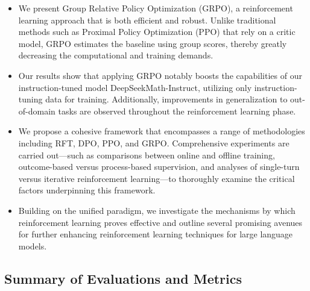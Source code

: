\begin{itemize}[topsep=0pt]
    \item We present Group Relative Policy Optimization (GRPO), a reinforcement learning approach that is both efficient and robust. Unlike traditional methods such as Proximal Policy Optimization (PPO) that rely on a critic model, GRPO estimates the baseline using group scores, thereby greatly decreasing the computational and training demands.
    \item Our results show that applying GRPO notably boosts the capabilities of our instruction-tuned model DeepSeekMath-Instruct, utilizing only instruction-tuning data for training. Additionally, improvements in generalization to out-of-domain tasks are observed throughout the reinforcement learning phase.
    \item We propose a cohesive framework that encompasses a range of methodologies including RFT, DPO, PPO, and GRPO. Comprehensive experiments are carried out—such as comparisons between online and offline training, outcome-based versus process-based supervision, and analyses of single-turn versus iterative reinforcement learning—to thoroughly examine the critical factors underpinning this framework.
    \item Building on the unified paradigm, we investigate the mechanisms by which reinforcement learning proves effective and outline several promising avenues for further enhancing reinforcement learning techniques for large language models.
\end{itemize}

\subsection{Summary of Evaluations and Metrics}

